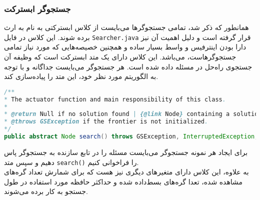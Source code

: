 	\subsubsection{جستجوگر ابسترکت}
	همانطور که ذکر شد، تمامی جستجوگرها می‌بایست از کلاس ابسترکتی به نام
	به ارث برده شوند. این کلاس در فایل 
	\texttt{Searcher.java}
	قرار گرفته است و دلیل اهمیت آن نیز دارا بودن اینترفیس و واسط بسیار ساده و همچنین خصیصه‌هایی که مورد نیاز تمامی جستجوگرهاست، می‌باشد. این کلاس دارای یک متد ابسترکت است که وظیفه آن جستجوی راه‌حل در مسئله داده شده است. هر جستجوگر می‌بایست جداگانه و با توجه به الگوریتم مورد نظر خود، این متد را پیاده‌سازی کند.
	\begin{latin}
		\begin{lstlisting}[language=Java]
/**
* The actuator function and main responsibility of this class.
*
* @return Null if no solution found | {@link Node} containing a solution.
* @throws GSException if the frontier is not initialized.
*/
public abstract Node search() throws GSException, InterruptedException;
\end{lstlisting}
	\end{latin}
	برای ایجاد هر نمونه جستجوگر می‌بایست مسئله را در تابع سازنده‌ به جستجوگر پاس دهیم و سپس متد
	\texttt{search()}
	 را فراخوانی کنیم.\\
	 به علاوه، این کلاس دارای متغیرهای دیگری نیز هست که برای شمارش تعداد گره‌های مشاهده شده، تعدا گره‌های بسط‌داده شده و حداکثر حافظه مورد استفاده در طول جستجو به کار برده می‌شوند.


	
	